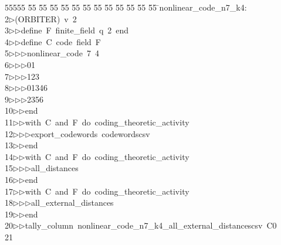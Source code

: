 %
%
\begin{tabbing}
55555 \= 55 \= 55 \= 55 \= 55 \= 55 \= 55 \= 55 \= 55 \= 55 \= 55 \= 55 \= 55 \= \>nonlinear\_code\_n7\_k4:\\[0pt]
2\>$\triangleright$\>(ORBITER)\ v\ 2\ \\[0pt]
3\>$\triangleright$\>$\triangleright$\>define\ F\ finite\_field\ q\ 2\ end\ \\[0pt]
4\>$\triangleright$\>$\triangleright$\>define\ C\ code\ field\ F\ \\[0pt]
5\>$\triangleright$\>$\triangleright$\>$\triangleright$\>nonlinear\_code\ 7\ 4\ \\[0pt]
6\>$\triangleright$\>$\triangleright$\>$\triangleright$\>01\ \\[0pt]
7\>$\triangleright$\>$\triangleright$\>$\triangleright$\>123\ \\[0pt]
8\>$\triangleright$\>$\triangleright$\>$\triangleright$\>01346\ \\[0pt]
9\>$\triangleright$\>$\triangleright$\>$\triangleright$\>2356\ \\[0pt]
10\>$\triangleright$\>$\triangleright$\>end\ \\[0pt]
11\>$\triangleright$\>$\triangleright$\>with\ C\ and\ F\ do\ coding\_theoretic\_activity\ \\[0pt]
12\>$\triangleright$\>$\triangleright$\>$\triangleright$\>export\_codewords\ codewordscsv\ \\[0pt]
13\>$\triangleright$\>$\triangleright$\>end\ \\[0pt]
14\>$\triangleright$\>$\triangleright$\>with\ C\ and\ F\ do\ coding\_theoretic\_activity\ \\[0pt]
15\>$\triangleright$\>$\triangleright$\>$\triangleright$\>all\_distances\ \\[0pt]
16\>$\triangleright$\>$\triangleright$\>end\ \\[0pt]
17\>$\triangleright$\>$\triangleright$\>with\ C\ and\ F\ do\ coding\_theoretic\_activity\ \\[0pt]
18\>$\triangleright$\>$\triangleright$\>$\triangleright$\>all\_external\_distances\ \\[0pt]
19\>$\triangleright$\>$\triangleright$\>end\ \\[0pt]
20\>$\triangleright$\>$\triangleright$\>tally\_column\ nonlinear\_code\_n7\_k4\_all\_external\_distancescsv\ C0\\[0pt]
21\>\end{tabbing}
